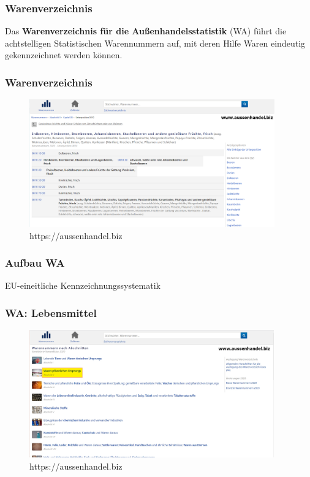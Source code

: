 \documentclass{beamer}
\begin{document}
\begin{frame}
\frametitle{Warenverzeichnis}
Das \textbf{Warenverzeichnis für die Außenhandelsstatistik} (WA) führt die
achtstelligen Statistischen Warennummern auf, mit deren Hilfe Waren
eindeutig gekennzeichnet werden können.
\end{frame}

\begin{frame}
\frametitle{Warenverzeichnis}
\begin{figure}[h]
    \centering
    \includegraphics[height=5.5cm]{warennummern}
    \caption{https://aussenhandel.biz}
  \end{figure}
\end{frame}

\begin{frame}
\frametitle{Aufbau WA}
EU-eineitliche Kennzeichnungssystematik
\end{frame}

\begin{frame}
\frametitle{WA: Lebensmittel}
  \begin{figure}[h]
    \centering
    \includegraphics[height=5.5cm]{wa}
    \caption{https://aussenhandel.biz}
  \end{figure}
\end{frame}
\end{document}
